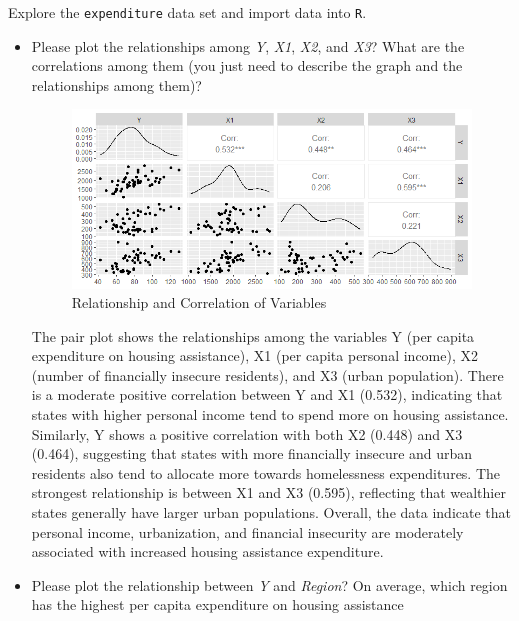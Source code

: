 \documentclass[12pt,letterpaper]{article}
\begin{document}
\vspace{.5cm}
\noindent Explore the \texttt{expenditure} data set and import data into \texttt{R}.
\vspace{.5cm}
  
\vspace{.5cm}
\begin{itemize}

\item
Please plot the relationships among \emph{Y}, \emph{X1}, \emph{X2}, and \emph{X3}? What are the correlations among them (you just need to describe the graph and the relationships among them)?
 

\begin{figure}[h]
    \centering
    \includegraphics[width=\textwidth]{Rplot07.png}
    \caption{Relationship and Correlation of Variables}
    \label{fig:yourlabel}
\end{figure}

The pair plot shows the relationships among the variables Y (per capita expenditure on housing assistance), X1 (per capita personal income), X2 (number of financially insecure residents), and X3 (urban population). There is a moderate positive correlation between Y and X1 (0.532), indicating that states with higher personal income tend to spend more on housing assistance. Similarly, Y shows a positive correlation with both X2 (0.448) and X3 (0.464), suggesting that states with more financially insecure and urban residents also tend to allocate more towards homelessness expenditures. The strongest relationship is between X1 and X3 (0.595), reflecting that wealthier states generally have larger urban populations. Overall, the data indicate that personal income, urbanization, and financial insecurity are moderately associated with increased housing assistance expenditure.

\vspace{.5cm}
\item
Please plot the relationship between \emph{Y} and \emph{Region}? On average, which region has the highest per capita expenditure on housing assistance
  


\end{itemize}
\end{document}
